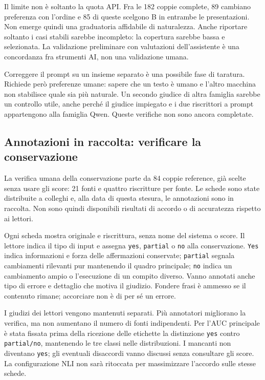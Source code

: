 \documentclass[11pt,a4paper]{article}
\begin{document}
Il limite non è soltanto la quota API. Fra le 182 coppie complete, 89 cambiano preferenza con l'ordine e 85 di queste scelgono B in entrambe le presentazioni. Non emerge quindi una graduatoria affidabile di naturalezza. Anche riportare soltanto i casi stabili sarebbe incompleto: la copertura sarebbe bassa e selezionata. La validazione preliminare con valutazioni dell'assistente è una concordanza fra strumenti AI, non una validazione umana.

Correggere il prompt su un insieme separato è una possibile fase di taratura. Richiede però preferenze umane: sapere che un testo è umano e l'altro macchina non stabilisce quale sia più naturale. Un secondo giudice di altra famiglia sarebbe un controllo utile, anche perché il giudice impiegato e i due riscrittori a prompt appartengono alla famiglia Qwen. Queste verifiche non sono ancora completate.

\subsection{Annotazioni in raccolta: verificare la conservazione}\label{annotazioni-in-raccolta-verificare-la-conservazione}

La verifica umana della conservazione parte da 84 coppie reference, già scelte senza usare gli score: 21 fonti e quattro riscritture per fonte. Le schede sono state distribuite a colleghi e, alla data di questa stesura, le annotazioni sono in raccolta. Non sono quindi disponibili risultati di accordo o di accuratezza rispetto ai lettori.

Ogni scheda mostra originale e riscrittura, senza nome del sistema o score. Il lettore indica il tipo di input e assegna \texttt{yes}, \texttt{partial} o \texttt{no} alla conservazione. \texttt{Yes} indica informazioni e forza delle affermazioni conservate; \texttt{partial} segnala cambiamenti rilevanti pur mantenendo il quadro principale; \texttt{no} indica un cambiamento ampio o l'esecuzione di un compito diverso. Vanno annotati anche tipo di errore e dettaglio che motiva il giudizio. Fondere frasi è ammesso se il contenuto rimane; accorciare non è di per sé un errore.

I giudizi dei lettori vengono mantenuti separati. Più annotatori migliorano la verifica, ma non aumentano il numero di fonti indipendenti. Per l'AUC principale è stata fissata prima della ricezione delle etichette la distinzione \texttt{yes} contro \nolinkurl{partial/no}, mantenendo le tre classi nelle distribuzioni. I mancanti non diventano \texttt{yes}; gli eventuali disaccordi vanno discussi senza consultare gli score. La configurazione NLI non sarà ritoccata per massimizzare l'accordo sulle stesse schede.
\end{document}
